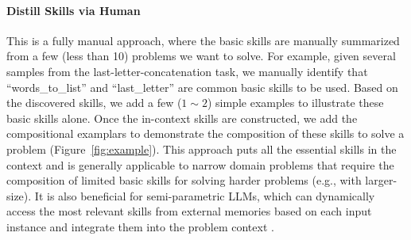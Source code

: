 \paragraph{Distill Skills via Human} 
This is a fully manual approach, where the basic skills are manually summarized from a few (less than 10) problems we want to solve. For example, given several samples from the last-letter-concatenation task, we manually identify that ``words\_to\_list'' and ``last\_letter'' are common basic skills to be used. Based on the discovered skills, we add a few ($1 \sim 2$) simple examples to illustrate these basic skills alone. Once the in-context skills are constructed, we add the compositional examplars to demonstrate the composition of these skills to solve a problem (Figure~\ref{fig:example}). This approach puts all the essential skills in the context and is generally applicable to narrow domain problems that require the composition of limited basic skills for solving harder problems (e.g., with larger-size). It is also beneficial for semi-parametric LLMs, which can dynamically access the most relevant skills from external memories based on each input instance and integrate them into the problem context \citep{pan2023knowledgeincontext}.




